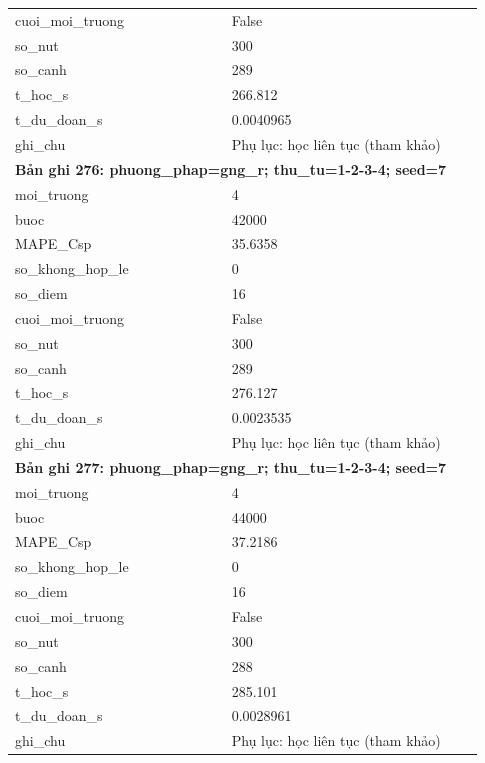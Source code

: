 \begin{longtable}{p{0.43\linewidth}p{0.50\linewidth}}
cuoi\_\allowbreak moi\_\allowbreak truong & False \\
so\_\allowbreak nut & 300 \\
so\_\allowbreak canh & 289 \\
t\_\allowbreak hoc\_\allowbreak s & 266.812 \\
t\_\allowbreak du\_\allowbreak doan\_\allowbreak s & 0.0040965 \\
ghi\_\allowbreak chu & Phụ lục: học liên tục (tham khảo) \\
\midrule
\multicolumn{2}{p{0.95\linewidth}}{\textbf{Bản ghi 276: phuong\_phap=gng\_r; thu\_tu=1-2-3-4; seed=7}} \\
moi\_\allowbreak truong & 4 \\
buoc & 42000 \\
MAPE\_\allowbreak Csp & 35.6358 \\
so\_\allowbreak khong\_\allowbreak hop\_\allowbreak le & 0 \\
so\_\allowbreak diem & 16 \\
cuoi\_\allowbreak moi\_\allowbreak truong & False \\
so\_\allowbreak nut & 300 \\
so\_\allowbreak canh & 289 \\
t\_\allowbreak hoc\_\allowbreak s & 276.127 \\
t\_\allowbreak du\_\allowbreak doan\_\allowbreak s & 0.0023535 \\
ghi\_\allowbreak chu & Phụ lục: học liên tục (tham khảo) \\
\midrule
\multicolumn{2}{p{0.95\linewidth}}{\textbf{Bản ghi 277: phuong\_phap=gng\_r; thu\_tu=1-2-3-4; seed=7}} \\
moi\_\allowbreak truong & 4 \\
buoc & 44000 \\
MAPE\_\allowbreak Csp & 37.2186 \\
so\_\allowbreak khong\_\allowbreak hop\_\allowbreak le & 0 \\
so\_\allowbreak diem & 16 \\
cuoi\_\allowbreak moi\_\allowbreak truong & False \\
so\_\allowbreak nut & 300 \\
so\_\allowbreak canh & 288 \\
t\_\allowbreak hoc\_\allowbreak s & 285.101 \\
t\_\allowbreak du\_\allowbreak doan\_\allowbreak s & 0.0028961 \\
ghi\_\allowbreak chu & Phụ lục: học liên tục (tham khảo) \\

\end{longtable}

